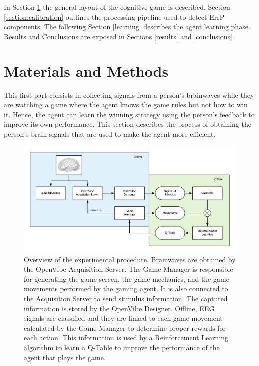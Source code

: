 \documentclass[journal]{IEEEtran}
\begin{document}

In Section \ref{section:materials} the general layout of the cognitive game is described. Section \ref{section:calibration} outlines the processing pipeline used to detect ErrP components. The following Section \ref{learning} describes the agent learning phase.   Results and Conclusions are exposed in Sections \ref{results} and \ref{conclusions}.

\section{Materials and Methods}
\label{section:materials}

This first part consists in collecting signals from a person's brainwaves while they are watching a game where the agent knows the game rules but not how to win it. Hence, the agent can learn the winning strategy using the person's feedback to improve its own performance. This section describes the process of obtaining the person's brain signals that are used to make the agent more efficient.

\begin{figure}
    \centering
    \includegraphics[width=\textwidth]{Images/complete_flow.png}
    \caption{Overview of the experimental procedure. Brainwaves are obtained by the OpenVibe Acquisition Server.  The Game Manager is responsible for generating the game screen, the game mechanics, and the game movements performed by the gaming agent.  It is also connected to the Acquisition Server to send stimulus information.  The captured information is stored by the OpenVibe Designer.  Offline, EEG signals are classified and they are linked to each game movement calculated by the Game Manager to determine proper rewards for each action.  This information is used by a Reinforcement Learning algorithm to learn a Q-Table to improve the performance of the agent that plays the game.}
    \label{diag:complete_flow}
\end{figure}
\end{document}
